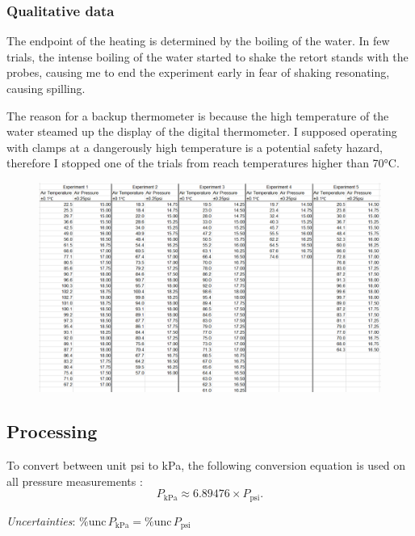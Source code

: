\documentclass[a4paper,12pt]{article}
\newcommand{\relun}{\% \text{unc}\,}
\begin{document}
\subsubsection*{Qualitative data}
The endpoint of the heating is determined by the boiling of the water. In few trials, the intense boiling of the water started to shake the retort stands with the probes, causing me to end the experiment early in fear of shaking resonating, causing spilling.

The reason for a backup thermometer is because the high temperature of the water steamed up the display of the digital thermometer. I supposed operating with clamps at a dangerously high temperature is a potential safety hazard, therefore I stopped one of the trials from reach temperatures higher than 70$\si{\celsius}$.

\begin{figure}[H]
    \centering
    \includegraphics[width=\textwidth]{assets/rawdata.png}
\end{figure}

\subsection{Processing}
To convert between unit psi to kPa, the following conversion equation is used on all pressure measurements \parencite{conver_units}:
\[
    P_{\text{kPa}} \approx 6.89476 \times P_{\text{psi}}.
\]

\textit{Uncertainties}: $\relun P_{\text{kPa}} = \relun P_{\text{psi}}$
\end{document}
